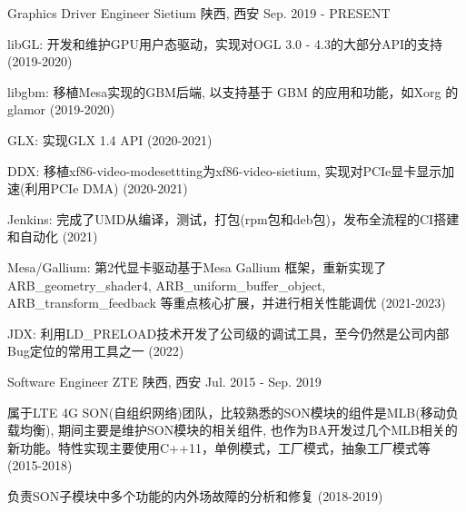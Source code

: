 
\begin{cventries}
  \cventry
    {Graphics Driver Engineer} %
    {Sietium} %
    {陕西, 西安} %
    {Sep. 2019 - PRESENT} %
    {
      \begin{cvitems} %
        \item {libGL: 开发和维护GPU用户态驱动，实现对OGL 3.0 - 4.3的大部分API的支持 (2019-2020)}
        \item {libgbm: 移植Mesa实现的GBM后端, 以支持基于 GBM 的应用和功能，如Xorg 的glamor (2019-2020)}
        \item {GLX: 实现GLX 1.4 API (2020-2021)}
        \item {DDX: 移植xf86-video-modesettting为xf86-video-sietium, 实现对PCIe显卡显示加速(利用PCIe DMA) (2020-2021)}
        \item {Jenkins: 完成了UMD从编译，测试，打包(rpm包和deb包)，发布全流程的CI搭建和自动化 (2021)}
        \item {\hspace{0.5cm}}
        \item {Mesa/Gallium: 第2代显卡驱动基于Mesa Gallium 框架，重新实现了ARB\_geometry\_shader4,  ARB\_uniform\_buffer\_object, ARB\_transform\_feedback 等重点核心扩展，并进行相关性能调优 (2021-2023)}
        \item {JDX: 利用LD\_PRELOAD技术开发了公司级的调试工具，至今仍然是公司内部Bug定位的常用工具之一 (2022)}
      \end{cvitems}
    }

  \cventry
    {Software Engineer} %
    {ZTE} %
    {陕西, 西安} %
    {Jul. 2015 - Sep. 2019} %
    {
      \begin{cvitems} %
      \item {属于LTE 4G SON(自组织网络)团队，比较熟悉的SON模块的组件是MLB(移动负载均衡), 期间主要是维护SON模块的相关组件, 也作为BA开发过几个MLB相关的新功能。特性实现主要使用C++11，单例模式，工厂模式，抽象工厂模式等 (2015-2018)}
      \item {负责SON子模块中多个功能的内外场故障的分析和修复 (2018-2019)}
      \end{cvitems}
    }
\end{cventries}
